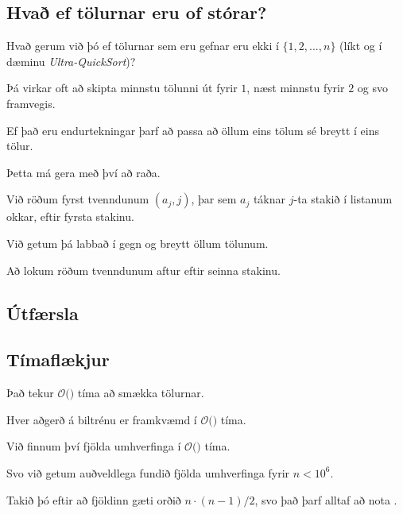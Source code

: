 \subsection{Hvað ef tölurnar eru of stórar?}
{
    {
        \item<1-> Hvað gerum við þó ef tölurnar sem eru gefnar eru ekki í $\{1, 2, ..., n\}$ (líkt og í dæminu \emph{Ultra-QuickSort})?
        \item<2-> Þá virkar oft að skipta minnstu tölunni út fyrir $1$, næst minnstu fyrir $2$ og svo framvegis.
        \item<3-> Ef það eru endurtekningar þarf að passa að öllum eins tölum sé breytt í eins tölur.
        \item<4-> Þetta má gera með því að raða.
        \item<5-> Við röðum fyrst tvenndunum $(a_j, j)$, þar sem $a_j$ táknar $j$-ta stakið í listanum okkar, eftir fyrsta stakinu.
        \item<6-> Við getum þá labbað í gegn og breytt öllum tölunum.
        \item<7-> Að lokum röðum tvenndunum aftur eftir seinna stakinu.
    }
}

\subsection{Útfærsla}
{
}

\subsection{Tímaflækjur}
{
    {
        \item<1-> Það tekur $\mathcal{O}($$)$ tíma að smækka tölurnar.
        \item<3-> Hver aðgerð á biltrénu er framkvæmd í $\mathcal{O}($$)$ tíma.
        \item<5-> Við finnum því fjölda umhverfinga í $\mathcal{O}($$)$ tíma.
        \item<7-> Svo við getum auðveldlega fundið fjölda umhverfinga fyrir $n < 10^6$.
        \item<8-> Takið þó eftir að fjöldinn gæti orðið $n \cdot (n - 1)/2$, svo það þarf alltaf að nota .
    }
}

